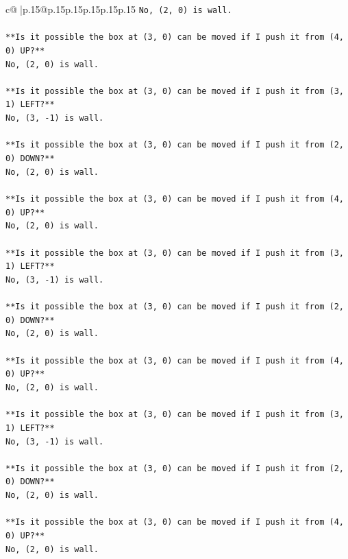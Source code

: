 \documentclass{article}
\begin{document}
{\begin{supertabular}{c@{$\;$}|p{.15\linewidth}@{}p{.15\linewidth}p{.15\linewidth}p{.15\linewidth}p{.15\linewidth}p{.15\linewidth}}
{{{\texttt{No, (2, 0) is wall.} \\
\\ 
\texttt{**Is it possible the box at (3, 0) can be moved if I push it from (4, 0) UP?**} \\
\texttt{No, (2, 0) is wall.} \\
\\ 
\texttt{**Is it possible the box at (3, 0) can be moved if I push it from (3, 1) LEFT?**} \\
\texttt{No, (3, {-}1) is wall.} \\
\\ 
\texttt{**Is it possible the box at (3, 0) can be moved if I push it from (2, 0) DOWN?**} \\
\texttt{No, (2, 0) is wall.} \\
\\ 
\texttt{**Is it possible the box at (3, 0) can be moved if I push it from (4, 0) UP?**} \\
\texttt{No, (2, 0) is wall.} \\
\\ 
\texttt{**Is it possible the box at (3, 0) can be moved if I push it from (3, 1) LEFT?**} \\
\texttt{No, (3, {-}1) is wall.} \\
\\ 
\texttt{**Is it possible the box at (3, 0) can be moved if I push it from (2, 0) DOWN?**} \\
\texttt{No, (2, 0) is wall.} \\
\\ 
\texttt{**Is it possible the box at (3, 0) can be moved if I push it from (4, 0) UP?**} \\
\texttt{No, (2, 0) is wall.} \\
\\ 
\texttt{**Is it possible the box at (3, 0) can be moved if I push it from (3, 1) LEFT?**} \\
\texttt{No, (3, {-}1) is wall.} \\
\\ 
\texttt{**Is it possible the box at (3, 0) can be moved if I push it from (2, 0) DOWN?**} \\
\texttt{No, (2, 0) is wall.} \\
\\ 
\texttt{**Is it possible the box at (3, 0) can be moved if I push it from (4, 0) UP?**} \\
\texttt{No, (2, 0) is wall.} \\
\\ 
}}}
\end{supertabular}}
\end{document}
